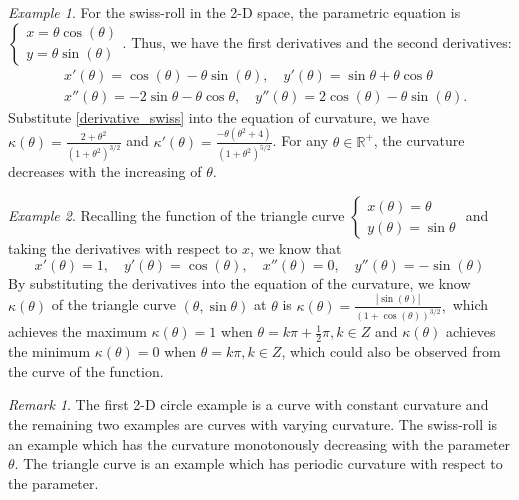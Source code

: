 \documentclass[aos,preprint]{imsart}
\theoremstyle{remark}
\newtheorem*{remark}{Remark}
\newtheorem{example}{Example}
\begin{document}
\begin{example}
For the swiss-roll in the 2-D space, the parametric equation is $\left\{ \begin{array}{c} x=\theta\cos(\theta)\\ y = \theta\sin(\theta)\end{array}\right.$. Thus, we have the first derivatives and the second derivatives:
\begin{equation}\label{derivative_swiss}
\begin{aligned}
&x'(\theta)=\cos(\theta)-\theta\sin(\theta),\quad y'(\theta)=\sin\theta+\theta\cos\theta\\
&x''(\theta)=-2\sin\theta-\theta\cos\theta,\quad y''(\theta)=2\cos(\theta)-\theta\sin(\theta).
\end{aligned}
\end{equation}
Substitute \eqref{derivative_swiss} into the equation of curvature, we have $\kappa(\theta)=\frac{2+\theta^2}{(1+\theta^2)^{3/2}}$ and $\kappa'(\theta) =\frac{ -\theta(\theta^2+4)}{(1+\theta^2)^{5/2}}$. For any $\theta\in {\mathbb R}^+$, the curvature decreases with the increasing of $\theta$.
\end{example}
\begin{example}
Recalling the function of the triangle curve 
$\left\{
\begin{array}{l}
x(\theta)=\theta\\
y(\theta)=\sin \theta
\end{array}
\right.$ and taking the derivatives with respect to $x$, we know that
\[
x'(\theta) = 1,\quad y'(\theta)= \cos(\theta),\quad x''(\theta)=0, \quad y''(\theta) = -\sin(\theta)
\]
By substituting the derivatives into the equation of the curvature, we know $\kappa(\theta)$ of the triangle curve $(\theta, \sin \theta)$ at $\theta$ is
$
\kappa(\theta) =  \frac{|\sin(\theta)|}{(1+\cos(\theta))^{3/2}},
$
which achieves the maximum $\kappa(\theta)=1$ when $\theta=k\pi+\frac{1}{2}\pi, k\in Z$ and $\kappa(\theta)$ achieves the minimum $\kappa(\theta)=0$ when $\theta=k\pi, k\in Z$, which could also be observed from the curve of the function.
\end{example}
\begin{remark}
The first 2-D circle example is a curve with constant curvature and the remaining two examples are curves with varying curvature. The swiss-roll is an example which has the curvature monotonously decreasing with the parameter $\theta$. The triangle curve is an example which has periodic curvature with respect to the parameter.
\end{remark}
\end{document}
